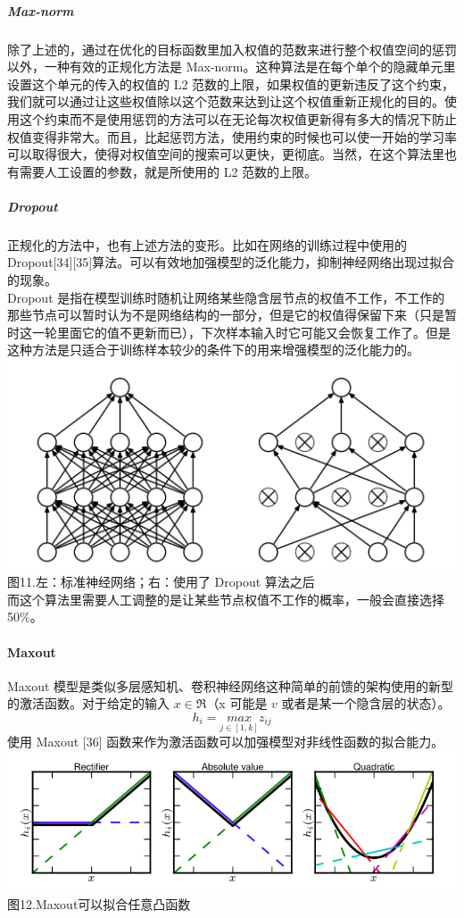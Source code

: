 \subparagraph{Max-norm}\label{max-norm}

除了上述的，通过在优化的目标函数里加入权值的范数来进行整个权值空间的惩罚以外，一种有效的正规化方法是
Max-norm。这种算法是在每个单个的隐藏单元里设置这个单元的传入的权值的 L2
范数的上限，如果权值的更新违反了这个约束，我们就可以通过让这些权值除以这个范数来达到让这个权值重新正规化的目的。使用这个约束而不是使用惩罚的方法可以在无论每次权值更新得有多大的情况下防止权值变得非常大。而且，比起惩罚方法，使用约束的时候也可以使一开始的学习率可以取得很大，使得对权值空间的搜索可以更快，更彻底。当然，在这个算法里也有需要人工设置的参数，就是所使用的
L2 范数的上限。

\subparagraph{Dropout}\label{dropout}

正规化的方法中，也有上述方法的变形。比如在网络的训练过程中使用的
Dropout{[}34{]}{[}35{]}算法。可以有效地加强模型的泛化能力，抑制神经网络出现过拟合的现象。\\Dropout
是指在模型训练时随机让网络某些隐含层节点的权值不工作，不工作的那些节点可以暂时认为不是网络结构的一部分，但是它的权值得保留下来（只是暂时这一轮里面它的值不更新而已），下次样本输入时它可能又会恢复工作了。但是这种方法是只适合于训练样本较少的条件下的用来增强模型的泛化能力的。\\\includegraphics{picture/dropout.png}\\图11.左：标准神经网络；右：使用了
Dropout
算法之后\\而这个算法里需要人工调整的是让某些节点权值不工作的概率，一般会直接选择
50\%。

\paragraph{Maxout}\label{maxout}

Maxout
模型是类似多层感知机、卷积神经网络这种简单的前馈的架构使用的新型的激活函数。对于给定的输入
\(x ∈ \Re\)（x 可能是 \(v\)
或者是某一个隐含层的状态）。\\\[h_i = {max}\limits_{j∈[1,k]}z_{ij}\]
使用 Maxout {[}36{]}
函数来作为激活函数可以加强模型对非线性函数的拟合能力。\\\includegraphics{picture/maxout.png}\\图12.Maxout可以拟合任意凸函数

